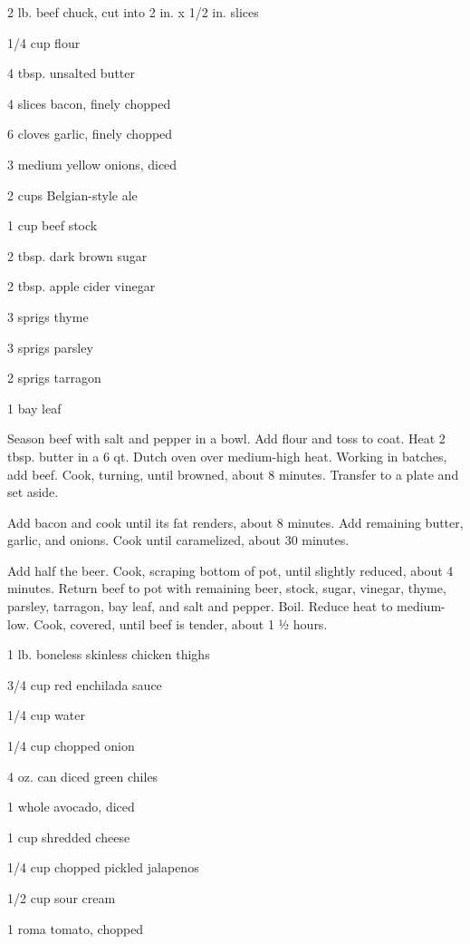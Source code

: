 \documentclass{cookbook}
\begin{document}
\begin{ingredients}
    \item 2 lb. beef chuck, cut into 2 in. x 1/2 in. slices
    \item 1/4 cup flour
    \item 4 tbsp. unsalted butter
    \item 4 slices bacon, finely chopped
    \item 6 cloves garlic, finely chopped
    \item 3 medium yellow onions, diced
    \item 2 cups Belgian-style ale
    \item 1 cup beef stock
    \item 2 tbsp. dark brown sugar
    \item 2 tbsp. apple cider vinegar
    \item 3 sprigs thyme
    \item 3 sprigs parsley
    \item 2 sprigs tarragon
    \item 1 bay leaf
\end{ingredients}

Season beef with salt and pepper in a bowl. Add flour and toss to coat. Heat 2 tbsp. butter in a 6 qt. Dutch oven over medium-high heat. Working in batches, add beef. Cook, turning, until browned, about 8 minutes. Transfer to a plate and set aside.

Add bacon and cook until its fat renders, about 8 minutes. Add remaining butter, garlic, and onions. Cook until caramelized, about 30 minutes.

Add half the beer. Cook, scraping bottom of pot, until slightly reduced, about 4 minutes. Return beef to pot with remaining beer, stock, sugar, vinegar, thyme, parsley, tarragon, bay leaf, and salt and pepper. Boil. Reduce heat to medium-low. Cook, covered, until beef is tender, about 1 ½ hours.


\begin{ingredients}
    \item 1 lb. boneless skinless chicken thighs
    \item 3/4 cup red enchilada sauce
    \item 1/4 cup water
    \item 1/4 cup chopped onion
    \item 4 oz. can diced green chiles
    \item 1 whole avocado, diced
    \item 1 cup shredded cheese
    \item 1/4 cup chopped pickled jalapenos
    \item 1/2 cup sour cream
    \item 1 roma tomato, chopped
\end{ingredients}
\end{document}
